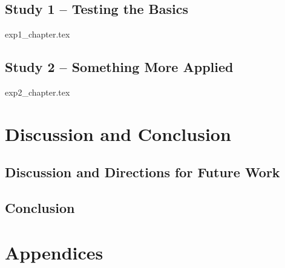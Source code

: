 \documentclass[11pt, oneside, a4paper]{book}
\begin{document}
\chapter{Study 1 -- Testing the Basics} \label{ch:Exp1}
\graphicspath{{../exp1_latex/exp1/}}
{exp1_chapter.tex}


\chapter{Study 2 -- Something More Applied} \label{ch:Exp2}
\graphicspath{{../exp2_latex/exp2/}}
{exp2_chapter.tex}


\part{Discussion and Conclusion} %
\label{Part3:Discussion}

\chapter{Discussion and Directions for Future Work} \label{ch:ThesisDiscussion}


\chapter{Conclusion} \label{ch:ThesisConclusions}




\newpage






\appendix %

\cleardoublepage{}  %

\part*{Appendices}
\end{document}

